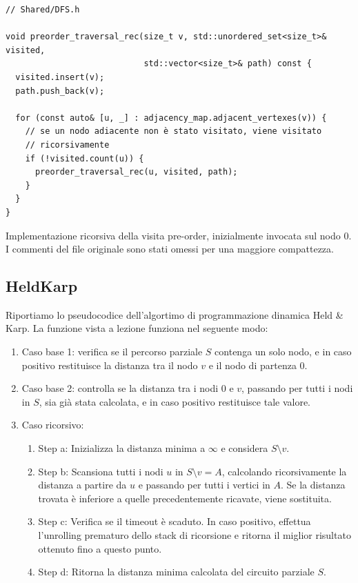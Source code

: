\begin{listing}[!ht]
\begin{verbatim}
// Shared/DFS.h

void preorder_traversal_rec(size_t v, std::unordered_set<size_t>& visited,
                            std::vector<size_t>& path) const {
  visited.insert(v);
  path.push_back(v);

  for (const auto& [u, _] : adjacency_map.adjacent_vertexes(v)) {
    // se un nodo adiacente non è stato visitato, viene visitato
    // ricorsivamente
    if (!visited.count(u)) {
      preorder_traversal_rec(u, visited, path);
    }
  }
}
\end{verbatim}
\caption{Implementazione ricorsiva della visita pre-order, inizialmente invocata sul nodo $0$. I commenti del file originale sono stati omessi per una maggiore compattezza.}
\label{listing:dfs}
\end{listing}

\subsection{HeldKarp}

Riportiamo lo pseudocodice dell'algortimo di programmazione dinamica Held \& Karp. La funzione  vista a lezione funziona nel seguente modo:

\begin{enumerate}
    \item Caso base 1: verifica se il percorso parziale $S$ contenga un solo nodo, e in caso positivo restituisce la distanza tra il nodo $v$ e il nodo di partenza $0$.
    \item Caso base 2: controlla se la distanza tra i nodi $0$ e $v$, passando per tutti i nodi in $S$, sia già stata calcolata, e in caso positivo restituisce tale valore.
    \item Caso ricorsivo:
    \begin{enumerate}
        \item Step a: Inizializza la distanza minima a $\infty$ e considera $S \setminus {v}$.
        \item Step b: Scansiona tutti i nodi $u$ in $S \setminus {v} = A$, calcolando ricorsivamente la distanza a partire da $u$ e passando per tutti i vertici in $A$. Se la distanza trovata è inferiore a quelle precedentemente ricavate, viene sostituita.
        \item Step c: Verifica se il timeout è scaduto. In caso positivo, effettua l'unrolling prematuro dello stack di ricorsione e ritorna il miglior risultato ottenuto fino a questo punto.
        \item Step d: Ritorna la distanza minima calcolata del circuito parziale $S$.
    \end{enumerate}
\end{enumerate}


